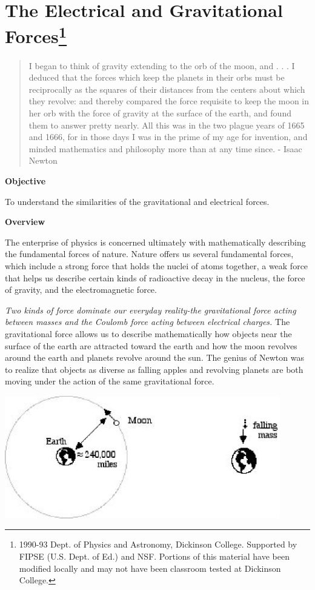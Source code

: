 
\section{The Electrical and Gravitational Forces\footnote{
1990-93 Dept. of Physics and Astronomy, Dickinson College. Supported by FIPSE
(U.S. Dept. of Ed.) and NSF. Portions of this material have been modified locally
and may not have been classroom tested at Dickinson College.
} }

\makelabheader %

\begin{quote}
I began to think of gravity extending to the orb of the moon, and . . . I deduced
that the forces which keep the planets in their orbs must be reciprocally as
the squares of their distances from the centers about which they revolve: and
thereby compared the force requisite to keep the moon in her orb with the force
of gravity at the surface of the earth, and found them to answer pretty nearly.
All this was in the two plague years of 1665 and 1666, for in those days I was
in the prime of my age for invention, and minded mathematics and philosophy
more than at any time since. - Isaac Newton 
\end{quote}
\textbf{Objective }

To understand the similarities of the gravitational and electrical forces. 

\textbf{Overview }

The enterprise of physics is concerned ultimately with mathematically describing
the fundamental forces of nature. Nature offers us several fundamental forces,
which include a strong force that holds the nuclei of atoms together, a weak
force that helps us describe certain kinds of radioactive decay in the nucleus,
the force of gravity, and the electromagnetic force. 

\textit{Two kinds of force dominate our everyday reality-the gravitational force
acting between masses and the Coulomb force acting between electrical charges.}
The gravitational force allows us to describe mathematically how objects near
the surface of the earth are attracted toward the earth and how the moon revolves
around the earth and planets revolve around the sun. The genius of Newton was
to realize that objects as diverse as falling apples and revolving planets are
both moving under the action of the same gravitational force. 

\answerspace{0.3cm}
\begin{center}
\includegraphics[width=0.9\textwidth]{elec_grav/elec_grav_fig1.eps} 
\end{center}
\answerspace{0.3cm}


